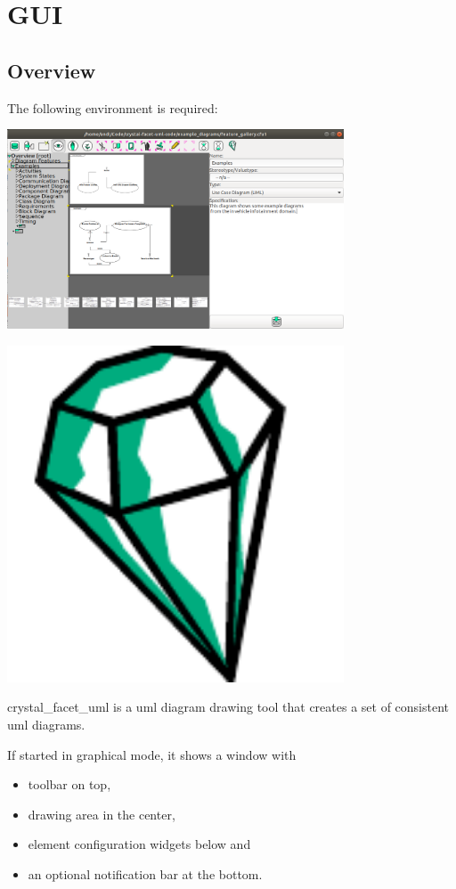 \chapter{GUI}
\label{gui}

\section{Overview}

The following environment is required:

\includegraphics[width=10cm]{screenshot_1.png}

\includegraphics[width=10cm]{../../gui/source/resources/crystal_facet_uml.pdf}


crystal\_facet\_uml is a uml diagram drawing tool
that creates a set of consistent uml diagrams.

If started in graphical mode, it shows a window with
\begin{itemize}
\item toolbar on top,
\item drawing area in the center,
\item element configuration widgets below and
\item an optional notification bar at the bottom.
\end{itemize}


